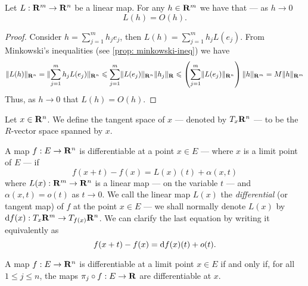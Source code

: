 \begin{proposition}\label{prop: linear-big-oh}
    Let \(L: \mathbf{R}^m \to \mathbf{R}^n\) be a linear map. For any \(h \in \mathbf{R}^m\) we have that
    --- as \(h \to 0\)
    \[
        L(h) = O(h).
    \]
\end{proposition}

\begin{proof}
    Consider \(h = \sum_{j = 1}^m h_j e_j\), then \(L(h) = \sum_{j=1}^m h_j
    L(e_j)\). From Minkowski's inequalities (see \cref{prop: minkowski-ineq}) we
    have
    \[
        \lVert L(h)\rVert_{\mathbf{R}^n} = \lVert\sum_{j=1}^m h_j L(e_j)\rVert_{\mathbf{R}^n}
        \leqslant \sum_{j=1}^m \lVert L(e_j)\rVert_{\mathbf{R}^n} \lVert h_j\rVert_{\mathbf{R}}
        \leqslant \left(\sum_{j=1}^m \lVert L(e_j)\rVert_{\mathbf{R}^n}\right) \lVert h\rVert_{\mathbf{R}^m}
        = M \lVert h\rVert_{\mathbf{R}^m}
    \]
    Thus, as \(h \to 0\) that \(L(h) = O(h)\).
\end{proof}

\begin{definition}
    Let \(x \in \mathbf{R}^n\). We define the tangent space of \(x\) --- denoted by
    \(T_x\mathbf{R}^n\) --- to be the \(R\)-vector space spanned by \(x\).
\end{definition}

\begin{definition}[Differentiable]\label{def: diff-several}
    A map \(f: E \to \mathbf{R}^n\) is differentiable at a point \(x \in E\) --- where
    \(x\) is a limit point of \(E\) --- if
    \begin{equation}\label{eq: diff-several-1}
        f(x + t) - f(x) = L(x)(t) + \alpha(x, t)
    \end{equation}
    where \(L(x): \mathbf{R}^m \to \mathbf{R}^n\) is a linear map --- on the variable \(t\) ---
    and \(\alpha(x, t) = o(t)\) as \(t \to 0\). We call the linear map \(L(x)\)
    the \emph{differential} (or tangent map) of \(f\) at the point \(x \in E\) ---
    we shall normally denote \(L(x)\) by \(\mathrm{d} f(x): T_x\mathbf{R}^m \to T_{f(x)}\mathbf{R}^n\).
    We can clarify the last equation by writing it equivalently as
    \begin{equation}\label{eq: diff-several-2}
        f(x + t) - f(x) = \mathrm{d} f(x)(t) + o(t).
    \end{equation}
\end{definition}

\begin{proposition}
    A map \(f: E \to \mathbf{R}^n\) is differentiable at a limit point \(x \in E\) if and
    only if, for all \(1 \leq j \leq n\), the maps \(\pi_j \circ f: E \to \mathbf{R}\) are
    differentiable at \(x\).
\end{proposition}


